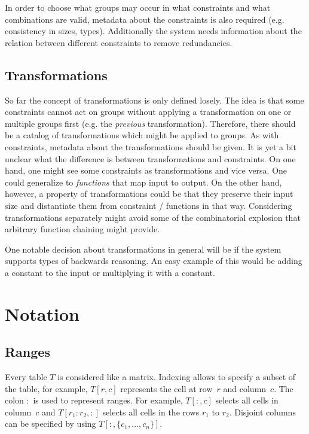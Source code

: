 \documentclass[a4paper]{article}
\newcommand{\range}[3]{#1[#2,#3]}
\newcommand{\rangeto}[2]{#1{:}#2}
\newcommand{\rangeall}{:}
\begin{document}
In order to choose what groups may occur in what constraints and what combinations are valid, metadata about the constraints is also required (e.g. consistency in sizes, types).
Additionally the system needs information about the relation between different constraints to remove redundancies.

\subsection{Transformations}
So far the concept of transformations is only defined losely.
The idea is that some constraints cannot act on groups without applying a transformation on one or multiple groups first (e.g. the \textit{previous} transformation).
Therefore, there should be a catalog of transformations which might be applied to groups.
As with constraints, metadata about the transformations should be given.
It is yet a bit unclear what the difference is between transformations and constraints.
On one hand, one might see some constraints as transformations and vice versa.
One could generalize to \textit{functions} that map input to output.
On the other hand, however, a property of transformations could be that they preserve their input size and distantiate them from constraint / functions in that way.
Considering transformations separately might avoid some of the combinatorial explosion that arbitrary function chaining might provide.

One notable decision about transformations in general will be if the system supports types of backwards reasoning.
An easy example of this would be adding a constant to the input or multiplying it with a constant.

\section{Notation}
\subsection{Ranges}
Every table $T$ is considered like a matrix.
Indexing allows to specify a subset of the table, for example, $\range{T}{r}{c}$ represents the cell at row~$r$ and column~$c$.
The colon $:$ is used to represent ranges.
For example, $\range{T}{\rangeall}{c}$ selects all cells in column~$c$ and $\range{T}{\rangeto{r_1}{r_2}}{\rangeall}$ selects all cells in the rows $r_1$ to $r_2$.
Disjoint columns can be specified by using $\range{T}{\rangeall}{\{c_1, ..., c_n\}}$.
\end{document}
